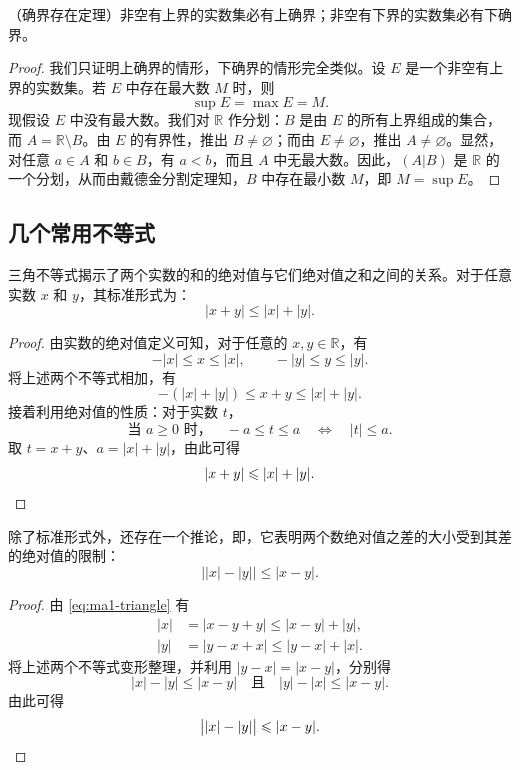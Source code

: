 \documentclass[UTF8,12pt,a4paper,fontset=fandol]{ctexbook}
\begin{document}
\begin{theorem}
（确界存在定理）非空有上界的实数集必有上确界；非空有下界的实数集必有下确界。


\begin{proof}
我们只证明上确界的情形，下确界的情形完全类似。设 $E$ 是一个非空有上界的实数集。若 $E$ 中存在最大数 $M$ 时，则
\[
  \sup E=\max E=M.
\]
现假设 $E$ 中没有最大数。我们对 $\mathbb{R}$ 作分划：$B$ 是由 $E$ 的所有上界组成的集合，而 $A=\mathbb{R}\setminus B$。由 $E$ 的有界性，推出 $B\ne\varnothing$；而由 $E\ne\varnothing$，推出 $A\ne\varnothing$。显然，对任意 $a\in A$ 和 $b\in B$，有 $a<b$，而且 $A$ 中无最大数。因此，$(A|B)$ 是 $\mathbb{R}$ 的一个分划，从而由戴德金分割定理知，$B$ 中存在最小数 $M$，即 $M=\sup E$。
\end{proof}
\end{theorem}


\subsection{几个常用不等式}
\quad 三角不等式揭示了两个实数的和的绝对值与它们绝对值之和之间的关系。对于任意实数 $x$ 和 $y$，其标准形式为：
\begin{equation}
  \label{eq:ma1-triangle}
  |x+y|\leqslant |x|+|y|.
\end{equation}


\begin{proof}
由实数的绝对值定义可知，对于任意的 $x,y\in\mathbb{R}$，有
\[
  -|x|\leqslant x\leqslant |x|,\qquad -|y|\leqslant y\leqslant |y|.
\]
将上述两个不等式相加，有
\[
  -(|x|+|y|)\leqslant x+y\leqslant |x|+|y|.
\]
接着利用绝对值的性质：对于实数 $t$，
\[
  \text{当 }a\geqslant0\text{ 时，}\quad
  -a\leqslant t\leqslant a\quad\Longleftrightarrow\quad |t|\leqslant a.
\]
取 $t=x+y$、$a=|x|+|y|$，由此可得
\[
  |x+y|\leqslant |x|+|y|.\qedhere
\]
\end{proof}


除了标准形式外，还存在一个推论，即，它表明两个数绝对值之差的大小受到其差的绝对值的限制：
\begin{equation}
  \label{eq:ma1-reverse-triangle}
  \bigl||x|-|y|\bigr|\leqslant |x-y|.
\end{equation}


\begin{proof}
由 \eqref{eq:ma1-triangle} 有
\[
\begin{aligned}
  |x|&=|x-y+y|\leqslant |x-y|+|y|,\\
  |y|&=|y-x+x|\leqslant |y-x|+|x|.
\end{aligned}
\]
将上述两个不等式变形整理，并利用 $|y-x|=|x-y|$，分别得
\[
  |x|-|y|\leqslant |x-y|\quad\text{且}\quad |y|-|x|\leqslant |x-y|.
\]
由此可得
\[
  \bigl||x|-|y|\bigr|\leqslant |x-y|.\qedhere
\]
\end{proof}
\end{document}
